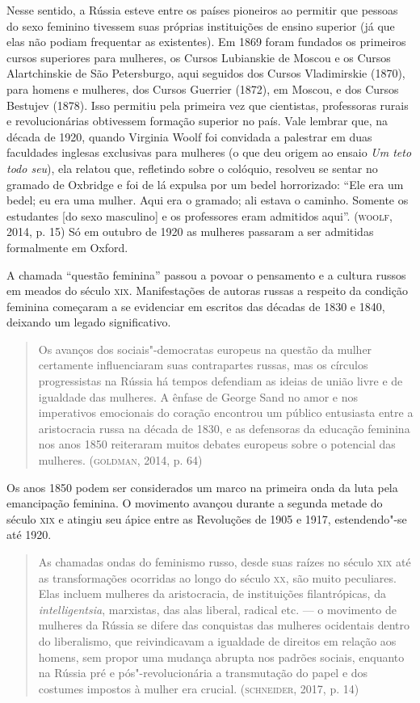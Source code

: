 \documentclass[11pt]{extarticle}
\begin{document}
Nesse sentido, a Rússia esteve
entre os países pioneiros ao permitir que pessoas do sexo feminino
tivessem suas próprias instituições de ensino superior (já que elas não
podiam frequentar as existentes). Em 1869 foram fundados os primeiros
cursos superiores para mulheres, os Cursos Lubianskie de Moscou e os
Cursos Alartchinskie de São Petersburgo, aqui seguidos dos Cursos
Vladimirskie (1870), para homens e mulheres, dos Cursos Guerrier (1872),
em Moscou, e dos Cursos Bestujev (1878). Isso permitiu pela primeira vez
que cientistas, professoras rurais e revolucionárias obtivessem formação
superior no país. Vale lembrar que, na década de 1920, quando Virginia
Woolf foi convidada a palestrar em duas faculdades inglesas exclusivas
para mulheres (o que deu origem ao ensaio \emph{Um teto todo seu}), ela
relatou que, refletindo sobre o colóquio, resolveu se sentar no gramado
de Oxbridge e foi de lá expulsa por um bedel horrorizado: ``Ele era um
bedel; eu era uma mulher. Aqui era o gramado; ali estava o caminho.
Somente os estudantes {[}do sexo masculino{]} e os professores eram
admitidos aqui''. (\textsc{woolf}, 2014, p. 15) Só em outubro de 1920 as mulheres
passaram a ser admitidas formalmente em Oxford.

A chamada ``questão feminina'' passou a povoar o pensamento e a cultura
russos em meados do século \textsc{xix}. Manifestações de autoras russas a
respeito da condição feminina começaram a se evidenciar em escritos das
décadas de 1830 e 1840, deixando um legado significativo.

\begin{quote}
Os avanços dos sociais"-democratas europeus na questão da mulher
certamente influenciaram suas contrapartes russas, mas os círculos
progressistas na Rússia há tempos defendiam as ideias de união livre e
de igualdade das mulheres. A ênfase de George Sand no amor e nos
imperativos emocionais do coração encontrou um público entusiasta entre
a aristocracia russa na década de 1830, e as defensoras da educação
feminina nos anos 1850 reiteraram muitos debates europeus sobre o
potencial das mulheres. (\textsc{goldman}, 2014, p. 64)
\end{quote}

Os anos 1850 podem ser considerados um marco na primeira onda da luta
pela emancipação feminina. O movimento avançou durante a segunda metade
do século \textsc{xix} e atingiu seu ápice entre as Revoluções de 1905 e 1917,
estendendo"-se até 1920.

\begin{quote}
As chamadas ondas do feminismo russo, desde suas raízes no século \textsc{xix}
até as transformações ocorridas ao longo do século \textsc{xx}, são muito
peculiares. Elas incluem mulheres da aristocracia, de instituições
filantrópicas, da \emph{intelligentsia}, marxistas, das alas liberal,
radical etc. --- o movimento de mulheres da Rússia se difere das
conquistas das mulheres ocidentais dentro do liberalismo, que
reivindicavam a igualdade de direitos em relação aos homens, sem propor
uma mudança abrupta nos padrões sociais, enquanto na Rússia pré e
pós"-revolucionária a transmutação do papel e dos costumes impostos à
mulher era crucial. (\textsc{schneider}, 2017, p. 14)
\end{quote}
\end{document}
